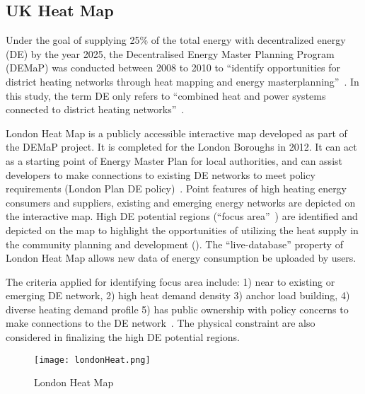 \subsection{UK Heat Map}
Under the goal of supplying 25\% of the total energy with
decentralized energy (DE) by the year 2025, the Decentralised Energy
Master Planning Program (DEMaP) was conducted between 2008 to 2010 to
``identify opportunities for district heating networks through heat
mapping and energy masterplanning''~\cite{londonHeatMap}. In this
study, the term DE only refers to ``combined heat and power systems
connected to district heating
networks''~\cite{decentralHeatMap2011}. 

London Heat Map is a publicly accessible interactive map developed as
part of the DEMaP project. It is completed for the London Boroughs in
2012. It can act as a starting point of Energy Master Plan for local
authorities, and can assist developers to make connections to existing
DE networks to meet policy requirements (London Plan DE
policy)~\cite{decentralHeatMap2011, londonHeatMap}. Point features of
high heating energy consumers and suppliers, existing and emerging
energy networks are depicted on the interactive map. High DE potential
regions (``focus area''~\cite{decentralHeatMap2011}) are identified
and depicted on the map to highlight the opportunities of utilizing
the heat supply in the community planning and development
(). The ``live-database'' property of London Heat
Map allows new data of energy consumption be uploaded by users.

The criteria applied for identifying focus area include: 1) near to
existing or emerging DE network, 2) high heat demand density 3) anchor
load building, 4) diverse heating demand profile 5) has public
ownership with policy concerns to make connections to the DE
network~\cite{decentralHeatMap2011}. The physical constraint are also
considered in finalizing the high DE potential regions.
\begin{figure}[h!]
  \centering
  \texttt{[image: londonHeat.png]}
  \caption[London Heat Map]{London Heat Map~\cite{londonHeatMapMap}}
  \label{fig:londonHeat}
\end{figure}

